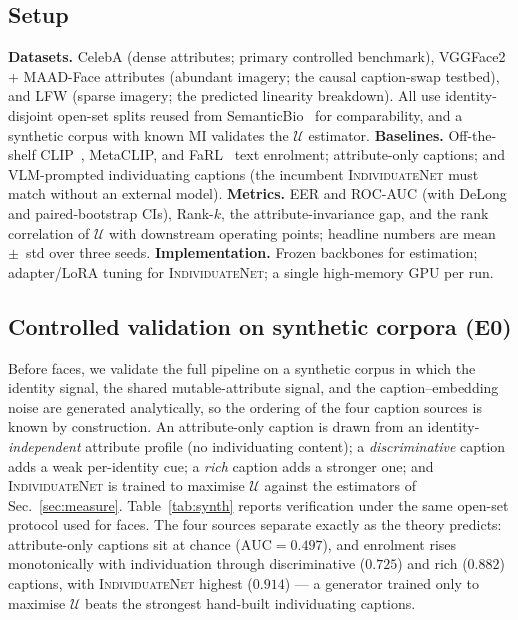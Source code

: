 \documentclass[10pt,twocolumn,letterpaper]{article}
\newcommand{\U}{\mathcal{U}}
\newcommand{\method}{\textsc{IndividuateNet}}
\begin{document}
\subsection{Setup}
\label{sec:exp-setup}
\textbf{Datasets.} CelebA (dense attributes; primary controlled benchmark), VGGFace2 +
MAAD-Face attributes (abundant imagery; the causal caption-swap testbed), and LFW (sparse
imagery; the predicted linearity breakdown). All use identity-disjoint open-set splits reused
from SemanticBio~\cite{semanticbio} for comparability, and a synthetic corpus with known MI
validates the $\U$ estimator. \textbf{Baselines.} Off-the-shelf CLIP~\cite{clip}, MetaCLIP, and
FaRL~\cite{farl} text enrolment; attribute-only captions; and VLM-prompted individuating
captions (the incumbent \method{} must match without an external model). \textbf{Metrics.} EER
and ROC-AUC (with DeLong and paired-bootstrap CIs), Rank-$k$, the attribute-invariance gap, and
the rank correlation of $\U$ with downstream operating points; headline numbers are
mean~$\pm$~std over three seeds. \textbf{Implementation.} Frozen backbones for estimation;
adapter/LoRA tuning for \method{}; a single high-memory GPU per run.

\subsection{Controlled validation on synthetic corpora (E0)}
\label{sec:e0}
Before faces, we validate the full pipeline on a synthetic corpus in which the identity signal,
the shared mutable-attribute signal, and the caption--embedding noise are generated analytically,
so the ordering of the four caption sources is known by construction. An attribute-only caption
is drawn from an identity-\emph{independent} attribute profile (no individuating content); a
\emph{discriminative} caption adds a weak per-identity cue; a \emph{rich} caption adds a stronger
one; and \method{} is trained to maximise $\U$ against the estimators of
Sec.~\ref{sec:measure}. Table~\ref{tab:synth} reports verification under the same open-set
protocol used for faces. The four sources separate exactly as the theory predicts: attribute-only
captions sit at chance ($\mathrm{AUC}=0.497$), and enrolment rises monotonically with
individuation through discriminative ($0.725$) and rich ($0.882$) captions, with \method{}
highest ($0.914$) --- a generator trained only to maximise $\U$ beats the strongest hand-built
individuating captions.
\end{document}
